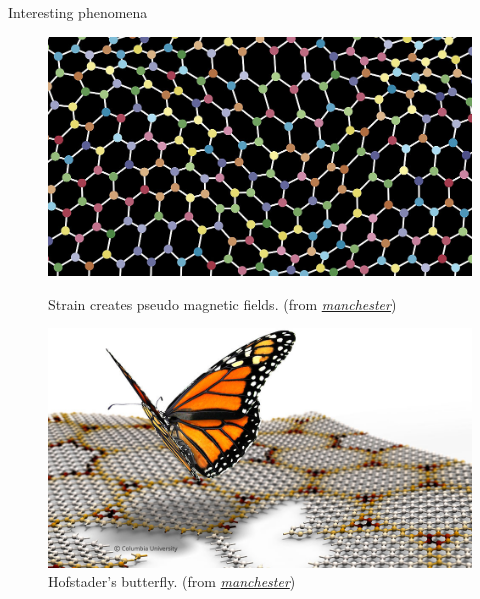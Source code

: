 \documentclass{beamer}
\begin{document}
  \begin{frame}{Interesting phenomena}
  \begin{figure}
  \centering
  \includegraphics[scale = 0.143]{2-strain-in-graphene-image-library-01_1000x565.jpg}
  \caption{Strain creates pseudo magnetic fields. (from 
    \href{http://www.graphene.manchester.ac.uk/}{\emph{manchester}})}
   \includegraphics[scale = 0.145]{16-hofstadter-butterfly-image-library-01_1000x565.jpg}
  \caption{Hofstader's butterfly. (from 
    \href{http://www.graphene.manchester.ac.uk/}{\emph{manchester}})}
   \end{figure}
  \end{frame}
  
\end{document}
